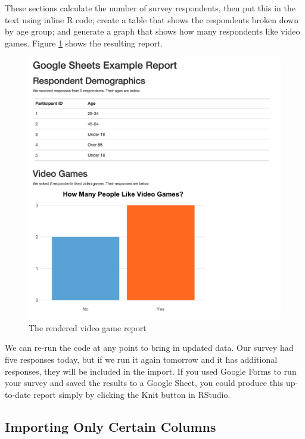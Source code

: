 \documentclass[
]{book}
\begin{document}
These sections calculate the number of survey respondents, then put this in the text using inline R code; create a table that shows the respondents broken down by age group; and generate a graph that shows how many respondents like video games. Figure \ref{fig:video-game-report} shows the resulting report.

\begin{figure}
\includegraphics[width=1\linewidth]{assets/video-game-report} \caption{The rendered video game report}\label{fig:video-game-report}
\end{figure}

We can re-run the code at any point to bring in updated data. Our survey had five responses today, but if we run it again tomorrow and it has additional responses, they will be included in the import. If you used Google Forms to run your survey and saved the results to a Google Sheet, you could produce this up-to-date report simply by clicking the Knit button in RStudio.

\hypertarget{importing-only-certain-columns}{%
\subsection*{Importing Only Certain Columns}\label{importing-only-certain-columns}}
\end{document}
